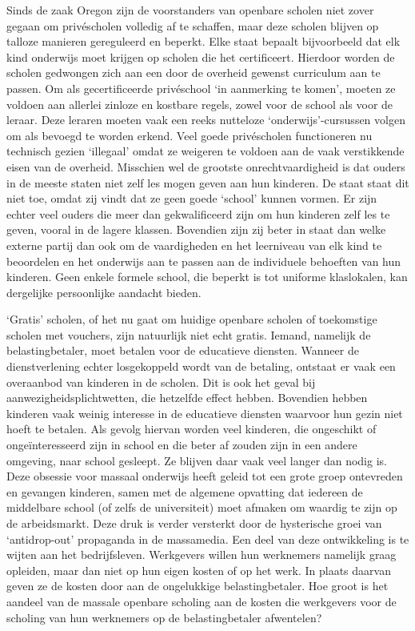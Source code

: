 \documentclass[
  a5paper,
  smalldemyvopaper,10pt,twoside,onecolumn,openright,extrafontsizes,hidelinks]{memoir}
\newlength\drop
\begin{document}
Sinds de zaak Oregon zijn de voorstanders van openbare scholen niet
zover gegaan om privéscholen volledig af te schaffen, maar deze scholen
blijven op talloze manieren gereguleerd en beperkt. Elke staat bepaalt
bijvoorbeeld dat elk kind onderwijs moet krijgen op scholen die het
certificeert. Hierdoor worden de scholen gedwongen zich aan een door de
overheid gewenst curriculum aan te passen. Om als gecertificeerde
privéschool `in aanmerking te komen', moeten ze voldoen aan allerlei
zinloze en kostbare regels, zowel voor de school als voor de leraar.
Deze leraren moeten vaak een reeks nutteloze `onderwijs'-cursussen
volgen om als bevoegd te worden erkend. Veel goede privéscholen
functioneren nu technisch gezien `illegaal' omdat ze weigeren te voldoen
aan de vaak verstikkende eisen van de overheid. Misschien wel de
grootste onrechtvaardigheid is dat ouders in de meeste staten niet zelf
les mogen geven aan hun kinderen. De staat staat dit niet toe, omdat zij
vindt dat ze geen goede `school' kunnen vormen. Er zijn echter veel
ouders die meer dan gekwalificeerd zijn om hun kinderen zelf les te
geven, vooral in de lagere klassen. Bovendien zijn zij beter in staat
dan welke externe partij dan ook om de vaardigheden en het leerniveau
van elk kind te beoordelen en het onderwijs aan te passen aan de
individuele behoeften van hun kinderen. Geen enkele formele school, die
beperkt is tot uniforme klaslokalen, kan dergelijke persoonlijke
aandacht bieden.

`Gratis' scholen, of het nu gaat om huidige openbare scholen of
toekomstige scholen met vouchers, zijn natuurlijk niet echt gratis.
Iemand, namelijk de belastingbetaler, moet betalen voor de educatieve
diensten. Wanneer de dienstverlening echter losgekoppeld wordt van de
betaling, ontstaat er vaak een overaanbod van kinderen in de scholen.
Dit is ook het geval bij aanwezigheidsplichtwetten, die hetzelfde effect
hebben. Bovendien hebben kinderen vaak weinig interesse in de educatieve
diensten waarvoor hun gezin niet hoeft te betalen. Als gevolg hiervan
worden veel kinderen, die ongeschikt of ongeïnteresseerd zijn in school
en die beter af zouden zijn in een andere omgeving, naar school
gesleept. Ze blijven daar vaak veel langer dan nodig is. Deze obsessie
voor massaal onderwijs heeft geleid tot een grote groep ontevreden en
gevangen kinderen, samen met de algemene opvatting dat iedereen de
middelbare school (of zelfs de universiteit) moet afmaken om waardig te
zijn op de arbeidsmarkt. Deze druk is verder versterkt door de
hysterische groei van `antidrop-out' propaganda in de massamedia. Een
deel van deze ontwikkeling is te wijten aan het bedrijfsleven.
Werkgevers willen hun werknemers namelijk graag opleiden, maar dan niet
op hun eigen kosten of op het werk. In plaats daarvan geven ze de kosten
door aan de ongelukkige belastingbetaler. Hoe groot is het aandeel van
de massale openbare scholing aan de kosten die werkgevers voor de
scholing van hun werknemers op de belastingbetaler afwentelen?
\end{document}
